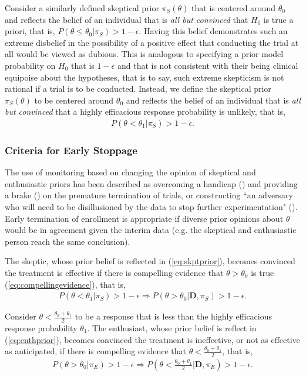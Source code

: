 \documentclass[12pt]{article}
\begin{document}
Consider a similarly defined skeptical prior $\pi_{S}(\theta)$ that is centered around $\theta_0$ and reflects the belief of an individual that is \textit{all but convinced} that $H_0$ is true a priori, that is, $P(\theta\leq\theta_0| \pi_{S})>1-\epsilon$. Having this belief demonstrates such an extreme disbelief in the possibility of a positive effect that conducting the trial at all would be viewed as dubious. This is analogous to specifying a prior model probability on $H_0$ that is $1-\epsilon$ and that is not consistent with their being clinical equipoise about the hypotheses, that is to say, such extreme skepticism is not rational if a trial is to be conducted. Instead, we define the skeptical prior $\pi_S(\theta)$ to be centered around $\theta_0$ and reflects the belief of an individual that is \textit{all but convinced} that a highly efficacious response probability is unlikely, that is,  
\begin{align}\label{eq:skptprior}
P(\theta<\theta_1| \pi_{S})>1-\epsilon.
\end{align}

\subsubsection{Criteria for Early Stoppage}
The use of monitoring based on changing the opinion of skeptical and enthusiastic priors has been described as overcoming a handicap (\cite{Freedman1989}) and providing a brake (\cite{Fayers1997}) on the premature termination of trials, or constructing ``an adversary who will need to be disillusioned by the data to stop further experimentation" (\cite{Spiegelhalter1994}). Early termination of enrollment is appropriate if diverse prior opinions about $\theta$ would be in agreement given the interim data (e.g. the skeptical and enthusiastic person reach the same conclusion). 

The skeptic, whose prior belief is reflected in (\ref{eq:skptprior}), becomes convinced the treatment is effective if there is compelling evidence that $\theta>\theta_0$ is true (\ref{eq:compellingevidence}), that is, 
\begin{align}
P(\theta<\theta_1|\pi_{S})>1-\epsilon \Rightarrow P(\theta>\theta_0| \mathbf{D},\pi_{S})>1-\epsilon.
\end{align}

Consider $\theta<\frac{\theta_0+\theta_1}{2}$ to be a response that is less than the highly efficacious response probability $\theta_1$. The enthusiast, whose prior belief is reflect in (\ref{eq:enthprior}), becomes convinced the treatment is ineffective, or not as effective as anticipated, if there is compelling evidence that $\theta<\frac{\theta_0+\theta_1}{2}$, that is, 
\begin{align}
P(\theta>\theta_0|\pi_{E})>1-\epsilon\Rightarrow P\left(\theta<\frac{\theta_0+\theta_1}{2}\Big| \mathbf{D},\pi_{E}\right)>1-\epsilon.
\end{align}
%
\end{document}
